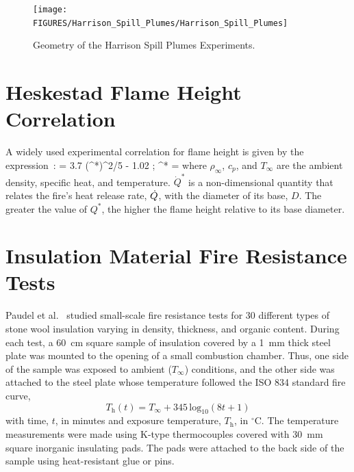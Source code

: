 \begin{figure}[p]
\texttt{[image: FIGURES/Harrison\_Spill\_Plumes/Harrison\_Spill\_Plumes]}
\caption{Geometry of the Harrison Spill Plumes Experiments.}
\label{Harrison_Drawing}
\end{figure}




\section{Heskestad Flame Height Correlation}
\label{Heskestad_Flame_Height_Description}

A widely used experimental correlation for flame height is given by the expression~\cite{Heskestad:FSJ1983,SFPE:Heskestad}:
\be
    = 3.7 \; (^*)^{2/5} - 1.02  \quad ; \quad {}^* = 
\ee
where $\rho_\infty$, $c_p$, and $T_\infty$ are the ambient density, specific heat, and temperature. $\dot{Q}^*$ is a non-dimensional quantity that relates the fire's heat release rate, $\dot{Q}$, with the diameter of its base, $D$. The greater the value of $Q^*$, the higher the flame height relative to its base diameter.

\section{Insulation Material Fire Resistance Tests}
\label{Insulation_Materials_Description}

Paudel et al.~\cite{Paudel:2021} studied small-scale fire resistance tests for 30 different types of stone wool insulation varying in density, thickness, and organic content. During each test, a 60~cm square sample of insulation covered by a 1~mm thick steel plate was mounted to the opening of a small combustion chamber. Thus, one side of the sample was exposed to ambient ($ T_\infty $) conditions, and the other side was attached to the steel plate whose temperature followed the ISO 834 standard fire curve,
\begin{equation}
   T_\textrm{h}(t) = T_\infty + 345 \, \textrm{log}_{10}(8t + 1)
   \label{eq:isocurve}
\end{equation}
with time, $t$, in minutes and exposure temperature, $T_{\textrm{h}}$, in $^\circ$C. The temperature measurements were made using K-type thermocouples covered with 30~mm square inorganic insulating pads. The pads were attached to the back side of the sample using heat-resistant glue or pins.

